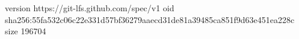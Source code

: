version https://git-lfs.github.com/spec/v1
oid sha256:55fa532c06c22e331d57bf36279aaecd31de81a39485ca851f9d63e451ea228c
size 196704
